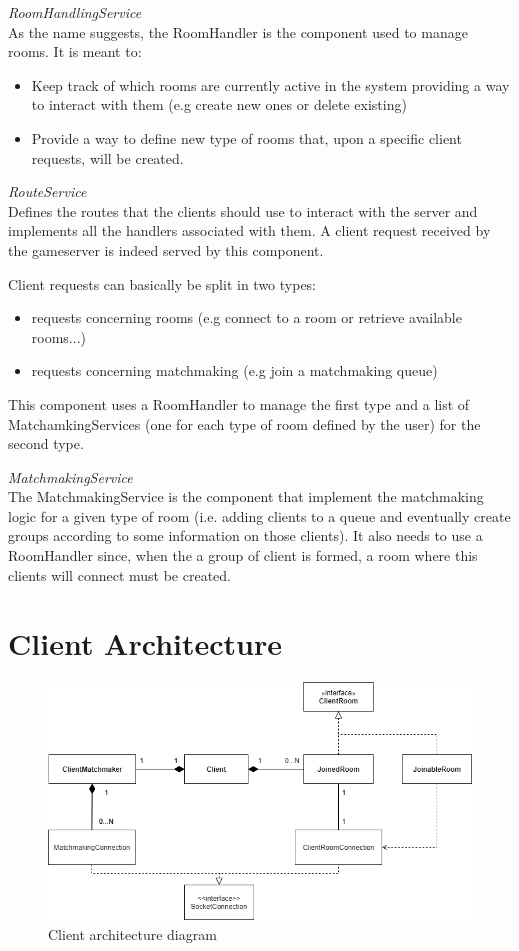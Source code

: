 \bigskip
\textit{RoomHandlingService}
\\
As the name suggests, the RoomHandler is the component used to manage rooms. It is meant to: 
\begin{itemize}
	\item Keep track of which rooms are currently active in the system providing a way to interact with them (e.g create new ones or delete existing)
	\item Provide a way to define new type of rooms that, upon a specific client requests, will be created.
\end{itemize}

\bigskip
\textit{RouteService}
\\
Defines the routes that the clients should use to interact with the server and implements all the handlers associated with them. A client request received by the gameserver is indeed served by this component. 

Client requests can basically be split in two types:
\begin{itemize}
	\item requests concerning rooms (e.g connect to a room or retrieve available rooms...)
	\item requests concerning matchmaking (e.g join a matchmaking queue)
\end{itemize}
This component uses a RoomHandler to manage the first type and a list of MatchamkingServices (one for each type of room defined by the user) for the second type. 

\bigskip
\textit{MatchmakingService}
\\
The MatchmakingService is the component that implement the matchmaking logic for a given type of room (i.e. adding clients to a queue and eventually create groups according to some information on those clients). It also needs to use a RoomHandler since, when the a group of client is formed, a room where this clients will connect must be created.



\section{Client Architecture}

\begin{figure}[H]
	\centering
	\includegraphics[scale=0.65]{images/3-architecture/client-architecture.png}
	\caption{Client architecture diagram}
	\label{fig:client_architecture}
\end{figure}


